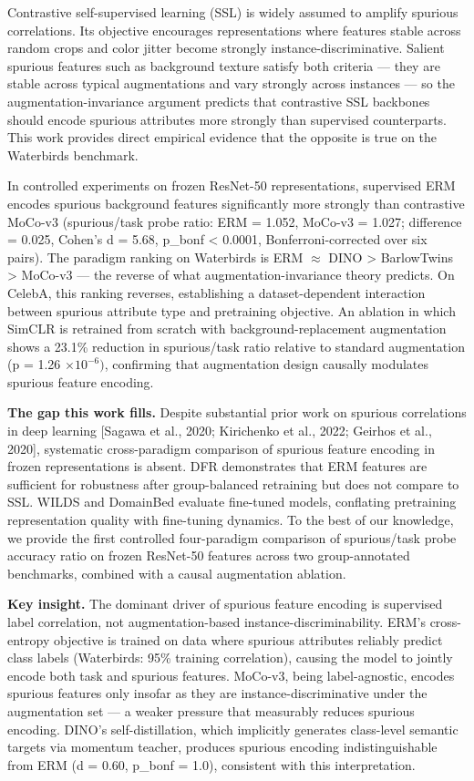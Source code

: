 
Contrastive self-supervised learning (SSL) is widely assumed to amplify spurious correlations. Its objective encourages representations where features stable across random crops and color jitter become strongly instance-discriminative. Salient spurious features such as background texture satisfy both criteria --- they are stable across typical augmentations and vary strongly across instances --- so the augmentation-invariance argument predicts that contrastive SSL backbones should encode spurious attributes more strongly than supervised counterparts. This work provides direct empirical evidence that the opposite is true on the Waterbirds benchmark.

In controlled experiments on frozen ResNet-50 representations, supervised ERM encodes spurious background features significantly more strongly than contrastive MoCo-v3 (spurious/task probe ratio: ERM = 1.052, MoCo-v3 = 1.027; difference = 0.025, Cohen's d = 5.68, p\_bonf < 0.0001, Bonferroni-corrected over six pairs). The paradigm ranking on Waterbirds is ERM $\approx$ DINO > BarlowTwins > MoCo-v3 --- the reverse of what augmentation-invariance theory predicts. On CelebA, this ranking reverses, establishing a dataset-dependent interaction between spurious attribute type and pretraining objective. An ablation in which SimCLR is retrained from scratch with background-replacement augmentation shows a 23.1\% reduction in spurious/task ratio relative to standard augmentation (p = 1.26 $\times 10^{-6})$, confirming that augmentation design causally modulates spurious feature encoding.

\textbf{The gap this work fills.} Despite substantial prior work on spurious correlations in deep learning [Sagawa et al., 2020; Kirichenko et al., 2022; Geirhos et al., 2020], systematic cross-paradigm comparison of spurious feature encoding in frozen representations is absent. DFR \citep{Kirichenko2022} demonstrates that ERM features are sufficient for robustness after group-balanced retraining but does not compare to SSL. WILDS \citep{Koh2021WILDS} and DomainBed \citep{Gulrajani2021DomainBed} evaluate fine-tuned models, conflating pretraining representation quality with fine-tuning dynamics. To the best of our knowledge, we provide the first controlled four-paradigm comparison of spurious/task probe accuracy ratio on frozen ResNet-50 features across two group-annotated benchmarks, combined with a causal augmentation ablation.

\textbf{Key insight.} The dominant driver of spurious feature encoding is supervised label correlation, not augmentation-based instance-discriminability. ERM's cross-entropy objective is trained on data where spurious attributes reliably predict class labels (Waterbirds: 95\% training correlation), causing the model to jointly encode both task and spurious features. MoCo-v3, being label-agnostic, encodes spurious features only insofar as they are instance-discriminative under the augmentation set --- a weaker pressure that measurably reduces spurious encoding. DINO's self-distillation, which implicitly generates class-level semantic targets via momentum teacher, produces spurious encoding indistinguishable from ERM (d = 0.60, p\_bonf = 1.0), consistent with this interpretation.

